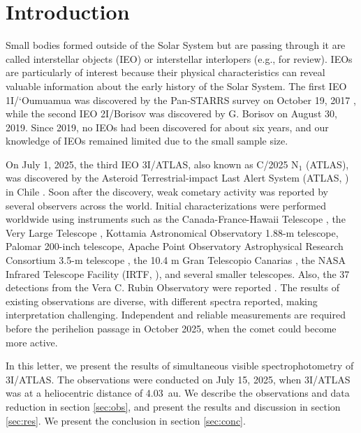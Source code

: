 \documentclass[]{pasj02}
\newcommand\I{3I/ATLAS\xspace}
\begin{document}
\section{Introduction}
Small bodies formed outside of the Solar System but are passing through it are called interstellar objects (IEO) or interstellar interlopers (e.g., \cite{Jewitt2023} for review).
IEOs are particularly of interest 
because their physical characteristics can reveal valuable information about the early history of the Solar System.
The first IEO 1I/`Oumuamua was discovered by the Pan-STARRS survey \citep{Chambers2016} on October 19, 2017 \citep{Meech2017}, while the second IEO 2I/Borisov was discovered by G. Borisov on August 30, 2019.
Since 2019, no IEOs had been discovered for about six years, and our knowledge of IEOs remained limited due to the small sample size.

On July 1, 2025, the third IEO 3I/ATLAS, also known as C/2025 N$_1$ (ATLAS), was discovered by the Asteroid Terrestrial-impact Last Alert System (ATLAS, \cite{Tonry2018}) in Chile \citep{Denneau2025}.
Soon after the discovery, weak cometary activity was reported by several observers across the world.
Initial characterizations were performed worldwide using instruments such as the Canada-France-Hawaii Telescope  \citep{Seligman2025_3I}, the Very Large Telescope \citep{Seligman2025_3I, Opitom2025_3I, Alvarez-Candal2025_3I}, 
Kottamia Astronomical Observatory 1.88-m telescope, Palomar 200-inch telescope, Apache Point Observatory Astrophysical Research Consortium 3.5-m telescope \citep{Bolin2025_3I, Belyakov2025_3I}, the 10.4 m Gran Telescopio Canarias \citep{Marcos2025_3I}, the NASA Infrared Telescope Facility (IRTF, \cite{Kareta2025_3I}), and several smaller telescopes.
Also, the 37 detections from the Vera C. Rubin Observatory were reported \citep{Chandler2025_3I}.
The results of existing observations are diverse, with different spectra reported, making interpretation challenging.
Independent and reliable measurements are required before the perihelion passage in October 2025, when the comet could become more active.

In this letter, we present the results of simultaneous visible spectrophotometry of \I.
The observations were conducted on July 15, 2025, when \I was at a heliocentric distance of 4.03~au.
We describe the observations and data reduction in section \ref{sec:obs}, and present the results and discussion in section \ref{sec:res}.
We present the conclusion in section \ref{sec:conc}.
\end{document}

